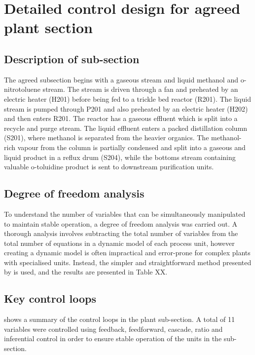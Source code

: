 \section{Detailed control design for agreed plant section}
\label{sec:subsec}

\subsection{Description of sub-section}
The agreed subsection begins with a gaseous  stream and liquid methanol and o-nitrotoluene stream. The  stream is driven through a fan and preheated by an electric heater (H201) before being fed to a trickle bed reactor (R201). The liquid stream is pumped through P201 and also preheated by an electric heater (H202) and then enters R201. The reactor has a gaseous effluent which is split into a recycle and purge stream. The liquid effluent enters a packed distillation column (S201), where methanol is separated from the heavier organics. The methanol-rich vapour from the column is partially condensed and split into a gaseous and liquid product in a reflux drum (S204), while the bottoms stream containing valuable o-toluidine product is sent to downstream purification units.

\subsection{Degree of freedom analysis}
To understand the number of variables that can be simultaneously manipulated to maintain stable operation, a degree of freedom analysis was carried out. A thorough analysis involves subtracting the total number of variables from the total number of equations in a dynamic model of each process unit, however creating a dynamic model is often impractical and error-prone for complex plants with specialised units. Instead, the simpler and straightforward method presented by \textcite{} is used, and the results are presented in Table XX.

\subsection{Key control loops}
 shows a summary of the control loops in the plant sub-section. A total of 11 variables were controlled using feedback, feedforward, cascade, ratio and inferential control in order to ensure stable operation of the units in the sub-section.

